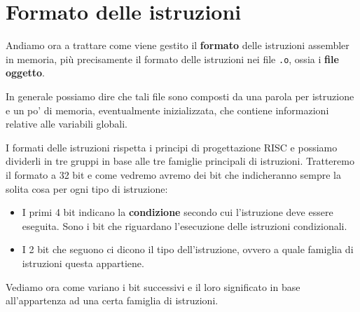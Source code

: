 \section{Formato delle istruzioni}
Andiamo ora a trattare come viene gestito il \textbf{formato} delle istruzioni assembler in memoria,
più precisamente il formato delle istruzioni nei file \verb|.o|, ossia i \textbf{file oggetto}.

In generale possiamo dire che tali file sono composti da una parola per istruzione e un po' di
memoria, eventualmente inizializzata, che contiene informazioni relative alle variabili globali.

I formati delle istruzioni rispetta i principi di progettazione RISC e possiamo dividerli in tre
gruppi in base alle tre famiglie principali di istruzioni. Tratteremo il formato a 32 bit e come
vedremo avremo dei bit che indicheranno sempre la solita cosa per ogni tipo di istruzione:
\begin{itemize}
	\item I primi 4 bit indicano la \textbf{condizione} secondo cui l'istruzione deve essere
	      eseguita. Sono i bit che riguardano l'esecuzione delle istruzioni condizionali.
	\item I 2 bit che seguono ci dicono il tipo dell'istruzione, ovvero a quale famiglia di
	      istruzioni questa appartiene.
\end{itemize}
Vediamo ora come variano i bit successivi e il loro significato in base all'appartenza ad una certa
famiglia di istruzioni.

